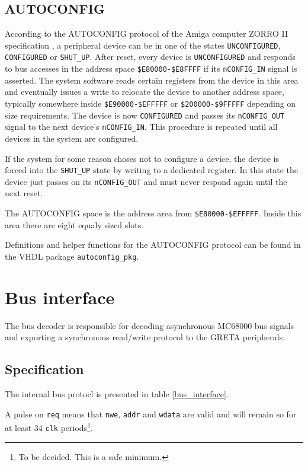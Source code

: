 \documentclass[a4paper]{report}
\begin{document}
\section{AUTOCONFIG}
According to the AUTOCONFIG protocol of the Amiga computer
ZORRO II specification \cite{a500_techref}, a peripheral
device can be in one of the states \texttt{UNCONFIGURED},
\texttt{CONFIGURED} or \texttt{SHUT\_UP}. After reset,
every device is \texttt{UNCONFIGURED} and responds to bus
accesses in the address space \texttt{\$E80000-\$E8FFFF}
if its \texttt{nCONFIG\_IN} signal is asserted. The system
software reads certain registers from the device in this
area and eventually issues a write to relocate the device
to another address space, typically somewhere inside
\texttt{\$E90000-\$EFFFFF} or \texttt{\$200000-\$9FFFFF}
depending on size requirements. The device is now
\texttt{CONFIGURED} and passes its \texttt{nCONFIG\_OUT} signal
to the next device's \texttt{nCONFIG\_IN}. This procedure is
repeated until all devices in the system are configured.

If the system for some reason choses not to configure a device,
the device is forced into the \texttt{SHUT\_UP} state by writing
to a dedicated register. In this state the device just passes
on its \texttt{nCONFIG\_OUT} and must never respond again
until the next reset.

The AUTOCONFIG space is the address area from
\texttt{\$E80000-\$EFFFFF}. Inside this area there are eight
equaly sized slots.

Definitions and helper functions for the AUTOCONFIG protocol
can be found in the VHDL package \texttt{autoconfig\_pkg}.

\chapter{Bus interface}
The bus decoder is responsible for decoding asynchronous
MC68000 bus signals and exporting a synchronous read/write
protocol to the GRETA peripherals.

\section{Specification}
The internal bus protocl is presented in table
\ref{bus_interface}.

A pulse on \texttt{req} means that \texttt{nwe}, \texttt{addr}
and \texttt{wdata} are valid and will remain so for at least
34 \texttt{clk} periods\footnote{To be decided. This is a
safe minimum.}.
\end{document}
